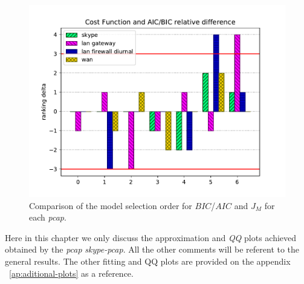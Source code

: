 \begin{figure}[ht!]
\includegraphics[scale=0.8]{figures/ch4/aicbic-costfunction-relative-diff}
\caption{Comparison of the model selection order for $BIC$/$AIC$ and  $J_M$ for each \textit{pcap}.}
\label{fig:cost-function_vs_aic-bic}
\end{figure}






Here in this chapter we only discuss the approximation and \textit{QQ} plots  achieved obtained by the \textit{pcap} \textit{skype-pcap}. All the other comments will be referent to the general results. The other fitting and QQ plots are provided on the appendix ~\ref{ap:aditional-plots} as a reference. 

